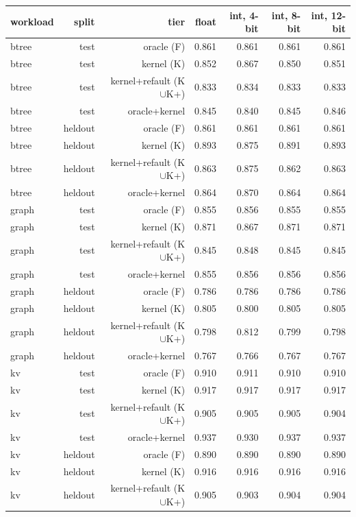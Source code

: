 \begin{tabular}{lrrrrrr}
\toprule
workload & split & tier & float & int, 4-bit & int, 8-bit & int, 12-bit \\
\midrule
btree & test & oracle (F) & 0.861 & 0.861 & 0.861 & 0.861 \\
btree & test & kernel (K) & 0.852 & 0.867 & 0.850 & 0.851 \\
btree & test & kernel{+}refault (K$\cup$K{+}) & 0.833 & 0.834 & 0.833 & 0.833 \\
btree & test & oracle{+}kernel & 0.845 & 0.840 & 0.845 & 0.846 \\
btree & heldout & oracle (F) & 0.861 & 0.861 & 0.861 & 0.861 \\
btree & heldout & kernel (K) & 0.893 & 0.875 & 0.891 & 0.893 \\
btree & heldout & kernel{+}refault (K$\cup$K{+}) & 0.863 & 0.875 & 0.862 & 0.863 \\
btree & heldout & oracle{+}kernel & 0.864 & 0.870 & 0.864 & 0.864 \\
graph & test & oracle (F) & 0.855 & 0.856 & 0.855 & 0.855 \\
graph & test & kernel (K) & 0.871 & 0.867 & 0.871 & 0.871 \\
graph & test & kernel{+}refault (K$\cup$K{+}) & 0.845 & 0.848 & 0.845 & 0.845 \\
graph & test & oracle{+}kernel & 0.855 & 0.856 & 0.856 & 0.856 \\
graph & heldout & oracle (F) & 0.786 & 0.786 & 0.786 & 0.786 \\
graph & heldout & kernel (K) & 0.805 & 0.800 & 0.805 & 0.805 \\
graph & heldout & kernel{+}refault (K$\cup$K{+}) & 0.798 & 0.812 & 0.799 & 0.798 \\
graph & heldout & oracle{+}kernel & 0.767 & 0.766 & 0.767 & 0.767 \\
kv & test & oracle (F) & 0.910 & 0.911 & 0.910 & 0.910 \\
kv & test & kernel (K) & 0.917 & 0.917 & 0.917 & 0.917 \\
kv & test & kernel{+}refault (K$\cup$K{+}) & 0.905 & 0.905 & 0.905 & 0.904 \\
kv & test & oracle{+}kernel & 0.937 & 0.930 & 0.937 & 0.937 \\
kv & heldout & oracle (F) & 0.890 & 0.890 & 0.890 & 0.890 \\
kv & heldout & kernel (K) & 0.916 & 0.916 & 0.916 & 0.916 \\
kv & heldout & kernel{+}refault (K$\cup$K{+}) & 0.905 & 0.903 & 0.904 & 0.904 \\

\end{tabular}
